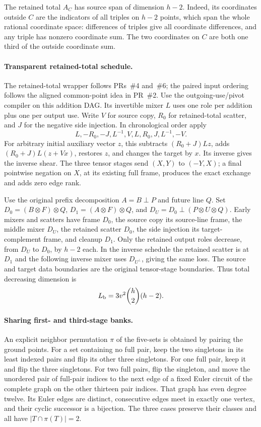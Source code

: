 The retained total $A_C$ has source span of dimension $h-2$. Indeed, its
coordinates outside $C$ are the indicators of all triples on $h-2$ points,
which span the whole rational coordinate space: differences of triples give
all coordinate differences, and any triple has nonzero coordinate sum.
The two coordinates on $C$ are both one third of the outside coordinate sum.

\paragraph{Transparent retained-total schedule.}
The retained-total wrapper follows PRs~\#4 and~\#6; the paired input ordering
follows the aligned common-point idea in PR~\#2. Use the outgoing-use/pivot
compiler on this addition DAG. Its invertible
mixer $L$ uses one role per addition plus one per output use. Write $V$ for
source copy, $R_0$ for retained-total scatter, and $J$ for the negative side
injection. In chronological order apply
\[
 L,-R_0,-J,L^{-1},V,L,R_0,J,L^{-1},-V.
\]
For arbitrary initial auxiliary vector $z$, this subtracts $(R_0+J)Lz$,
adds $(R_0+J)L(z+Vx)$, restores $z$, and changes the target by $x$.
Its inverse gives the inverse shear. The three tensor stages send
$(X,Y)$ to $(-Y,X)$; a final pointwise negation on $X$, at its existing full
frame, produces the exact exchange and adds zero edge rank.

Use the original prefix decomposition $A=B\perp P$ and future line $Q$.
Set $D_0=(B\otimes F)\otimes Q$, $D_1=(A\otimes F)\otimes Q$, and
$D_U=D_0\perp(P\otimes U\otimes Q)$. Early mixers and scatters have frame
$D_0$, the source copy its source-line frame, the middle mixer $D_U$, the
retained scatter $D_0$, the side injection its target-complement frame,
and cleanup $D_1$. Only the retained output roles decrease, from $D_U$ to
$D_0$, by $h-2$ each. In the inverse schedule the retained scatter is at
$D_1$ and the following inverse mixer uses $D_{U^\perp}$, giving the same
loss. The source and target data boundaries are the original tensor-stage
boundaries. Thus total decreasing dimension is
\[
 L_{\rm b}=3v^2\binom h2(h-2).
\]

\paragraph{Sharing first- and third-stage banks.}
An explicit neighbor permutation $\pi$ of the five-sets is obtained by
pairing the ground points. For a set containing no full pair, keep the two
singletons in its least indexed pairs and flip its other three singletons.
For one full pair, keep it and flip the three singletons. For two full pairs,
flip the singleton, and move the unordered pair of full-pair indices to the
next edge of a fixed Euler circuit of the complete graph on the other
thirteen pair indices. That graph has even degree twelve. Its Euler edges
are distinct, consecutive edges meet in exactly one vertex, and their cyclic
successor is a bijection. The three cases preserve their classes and all
have $|T\cap\pi(T)|=2$.

